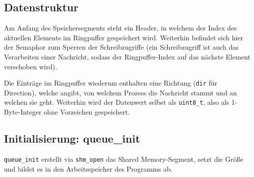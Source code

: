 \documentclass[12pt, a4paper]{scrartcl}
\begin{document}
\subsection{Datenstruktur}

Am Anfang des Speichersegments steht ein Header, in welchem der Index des
aktuellen Elements im Ringpuffer gespeichert wird. Weiterhin befindet sich hier
der Semaphor zum Sperren der Schreibzugriffe (ein Schreibzugriff ist auch das
Verarbeiten einer Nachricht, sodass der Ringpuffer-Index auf das nächste
Element verschoben wird).
\np

Die Einträge im Ringpuffer wiederum enthalten eine Richtung (\texttt{dir} für
Direction), welche angibt, von welchem Prozess die Nachricht stammt und an
welchen sie geht. Weiterhin wird der Datenwert selbst als \texttt{uint8\_t},
also als 1-Byte-Integer ohne Vorzeichen gespeichert.

\subsection{Initialisierung: queue\_init}

\texttt{queue\_init} erstellt via \texttt{shm\_open} das Shared Memory-Segment, setzt die Größe und bildet es in den Arbeitsspeicher des Programms ab.
\end{document}
